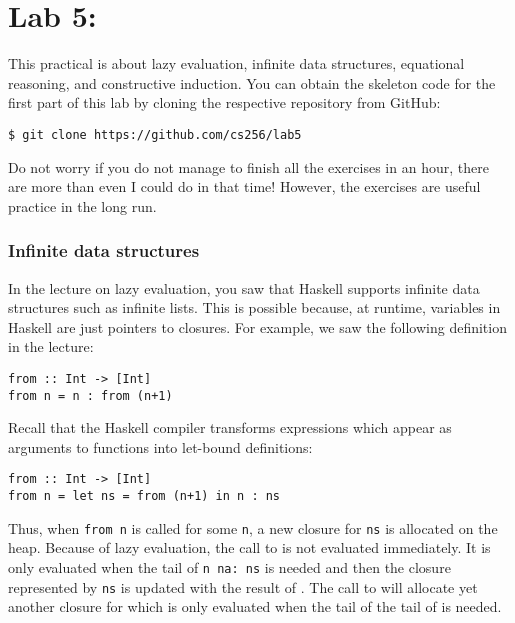 \section{Lab 5: \practicalFiveTitle}

This practical is about lazy evaluation, infinite data structures, equational reasoning, and constructive induction. You can obtain the skeleton code for the first part of this lab by cloning the respective repository from GitHub:
\begin{verbatim}
$ git clone https://github.com/cs256/lab5
\end{verbatim}
Do not worry if you do not manage to finish all the exercises in an hour, there are more than even I could do in that time! However, the exercises are useful practice in the long run.

\subsubsection{Infinite data structures}

In the lecture on lazy evaluation, you saw that Haskell supports infinite data structures such as infinite lists. This is possible because, at runtime, variables in Haskell are just pointers to closures. For example, we saw the following definition in the lecture:
\begin{verbatim}
from :: Int -> [Int]
from n = n : from (n+1)
\end{verbatim}
Recall that the Haskell compiler transforms expressions which appear as arguments to functions into let-bound definitions:
\begin{verbatim}
from :: Int -> [Int]
from n = let ns = from (n+1) in n : ns
\end{verbatim}
Thus, when \texttt{\small from n} is called for some \texttt{\small n}, a new closure for \texttt{\small ns} is allocated on the heap. Because of lazy evaluation, the call to  is not evaluated immediately. It is only evaluated when the tail of \texttt{\small n~na:~ns} is needed and then the closure represented by \texttt{\small ns} is updated with the result of . The call to  will allocate yet another closure for  which is only evaluated when the tail of the tail of  is needed.

\taskLine 


